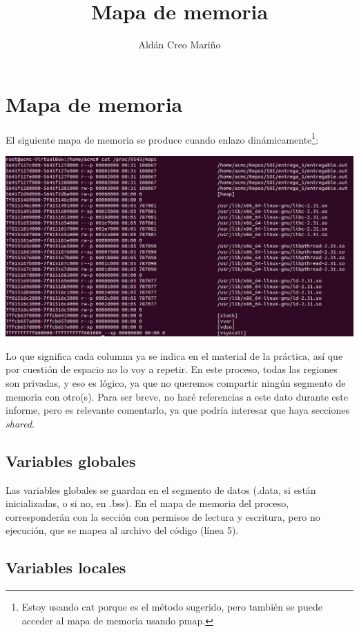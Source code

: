 \documentclass[a4paper]{article}
\title{Mapa de memoria}
\author{Aldán Creo Mariño}
\begin{document}

\section{Mapa de memoria}

El siguiente mapa de memoria se produce cuando enlazo dinámicamente\footnote{Estoy usando {\ttfamily cat} porque es el método sugerido, pero también se puede acceder al mapa de memoria usando {\ttfamily pmap}.}:

\includegraphics[scale=0.421]{6_padre.png}

Lo que significa cada columna ya se indica en el material de la práctica, así que por cuestión de espacio no lo voy a repetir. En este proceso, todas las regiones son privadas, y eso es lógico, ya que no queremos compartir ningún segmento de memoria con otro(s). Para ser breve, no haré referencias a este dato durante este informe, pero es relevante comentarlo, ya que podría interesar que haya secciones \emph{shared}.

\subsection{Variables globales}

Las variables globales se guardan en el segmento de datos ({\ttfamily.data}, si están inicializadas, o si no, en {\ttfamily.bss}). En el mapa de memoria del proceso, corresponderán con la sección con permisos de lectura y escritura, pero no ejecución, que se mapea al archivo del código (línea 5).

\subsection{Variables locales}
\end{document}
